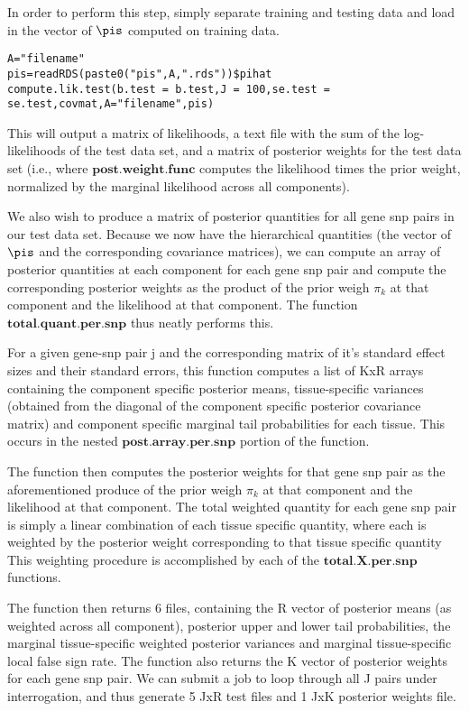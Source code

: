 \documentclass[10pt]{article}
\begin{document}
In order to perform this step, simply separate training and testing data and load in the vector of $\pis$ computed on training data.

\begin{verbatim}
A="filename"
pis=readRDS(paste0("pis",A,".rds"))$pihat
compute.lik.test(b.test = b.test,J = 100,se.test = se.test,covmat,A="filename",pis) 
\end{verbatim}

This will output a matrix of likelihoods, a text file with the sum of the log-likelihoods of the test data set, and a matrix of posterior weights for the test data set (i.e., where $\textbf{post.weight.func}$ computes the likelihood times the prior weight, normalized by the marginal likelihood across all components).

We also wish to produce a matrix of posterior quantities for all gene snp pairs in our test data set. Because we now have the hierarchical quantities (the vector of $\pis$ and the corresponding covariance matrices), we can compute an array of posterior quantities at each component for each gene snp pair and compute the corresponding posterior weights as the product of the prior weigh $\pi_{k}$ at that component and the likelihood at that component. The function $\textbf{total.quant.per.snp}$ thus neatly performs this.

For a given gene-snp pair j and the corresponding matrix of it's standard effect sizes and their standard errors, this function computes a list of KxR arrays  containing the component specific posterior means, tissue-specific variances (obtained from the diagonal of the component specific posterior covariance matrix) and component specific marginal tail probabilities for each tissue. This occurs in the nested $\textbf{post.array.per.snp}$ portion of the function.

The function then computes the posterior weights for that gene snp pair as the aforementioned produce of the prior weigh $\pi_{k}$ at that component and the likelihood at that component. The total weighted quantity for each gene snp pair is simply a linear combination of each tissue specific quantity, where each is weighted by the posterior weight corresponding to that tissue specific quantity This weighting procedure is accomplished by each of the $\textbf{total.X.per.snp}$ functions.

The function then returns  6 files, containing the R vector of posterior means (as weighted across all component), posterior upper and lower tail probabilities, the marginal tissue-specific weighted posterior variances and marginal tissue-specific local false sign rate. The function also returns the K vector of posterior weights for each gene snp pair. We can submit a job to loop through all J pairs under interrogation, and thus generate 5 JxR test files and 1 JxK posterior weights file.
\end{document}
